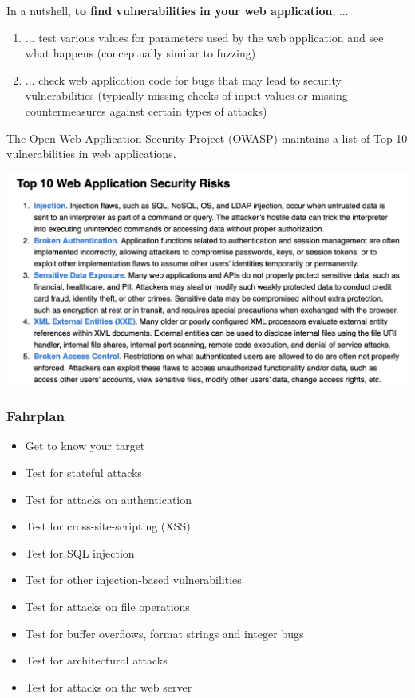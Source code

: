 \documentclass[aspectratio=169]{beamer}
\begin{document}
\begin{frame}
    In a nutshell, \textbf{to find vulnerabilities in your web application}, ...
    \begin{enumerate}
        \item ... test various values for parameters used by the web application and see what happens (conceptually similar to fuzzing)
        \item ... check web application code for bugs that may lead to security vulnerabilities (typically missing checks of input values or missing countermeasures against certain types of attacks)
    \end{enumerate}
\end{frame}

\begin{frame}

    The \href{https://owasp.org/www-project-top-ten/}{Open Web Application Security Project (OWASP)} maintains a list of Top 10 vulnerabilities in web applications.

    \begin{center}
        \includegraphics[scale=.35,angle=2]{img/owasp-top10.png}    
    \end{center}
\end{frame}

\begin{frame}
    \frametitle{Fahrplan}

    \begin{itemize}
        \item Get to know your target
        \item Test for stateful attacks
        \item Test for attacks on authentication
        \item Test for cross-site-scripting (XSS)
        \item Test for SQL injection
        \item Test for other injection-based vulnerabilities
        \item Test for attacks on file operations
        \item Test for buffer overflows, format strings and integer bugs
        \item Test for architectural attacks
        \item Test for attacks on the web server 
    \end{itemize}

\end{frame}
\end{document}
